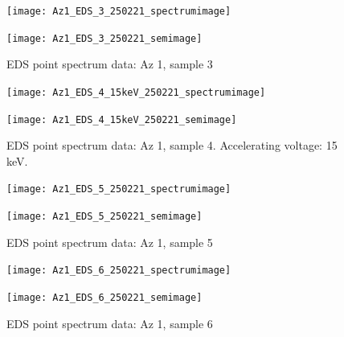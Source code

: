 \begin{figure}[H]
\centering
\begin{minipage}{.45\textwidth}
  \centering
  \texttt{[image: Az1\_EDS\_3\_250221\_spectrumimage]}
\end{minipage}
\begin{minipage}{.45\textwidth}
  \centering
  \texttt{[image: Az1\_EDS\_3\_250221\_semimage]}
\end{minipage}
\caption[EDS point spectrum data: Az 1, sample 3]{EDS point spectrum data: Az 1, sample 3}
\label{fig:az1_point_eds_3}
\end{figure}

\begin{figure}[H]
\centering
\begin{minipage}{.45\textwidth}
  \centering
  \texttt{[image: Az1\_EDS\_4\_15keV\_250221\_spectrumimage]}
\end{minipage}
\begin{minipage}{.45\textwidth}
  \centering
  \texttt{[image: Az1\_EDS\_4\_15keV\_250221\_semimage]}
\end{minipage}
\caption[EDS point spectrum data: Az 1, sample 4]{EDS point spectrum data: Az 1, sample 4. Accelerating voltage: 15 keV.}
\label{fig:az1_point_eds_4}
\end{figure}

\begin{figure}[H]
\centering
\begin{minipage}{.45\textwidth}
  \centering
  \texttt{[image: Az1\_EDS\_5\_250221\_spectrumimage]}
\end{minipage}
\begin{minipage}{.45\textwidth}
  \centering
  \texttt{[image: Az1\_EDS\_5\_250221\_semimage]}
\end{minipage}
\caption[EDS point spectrum data: Az 1, sample 5]{EDS point spectrum data: Az 1, sample 5}
\label{fig:az1_point_eds_5}
\end{figure}

\begin{figure}[H]
\centering
\begin{minipage}{.45\textwidth}
  \centering
  \texttt{[image: Az1\_EDS\_6\_250221\_spectrumimage]}
\end{minipage}
\begin{minipage}{.45\textwidth}
  \centering
  \texttt{[image: Az1\_EDS\_6\_250221\_semimage]}
\end{minipage}
\caption[EDS point spectrum data: Az 1, sample 6]{EDS point spectrum data: Az 1, sample 6}
\label{fig:az1_point_eds_6}
\end{figure}




